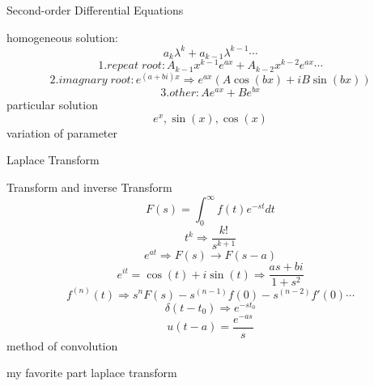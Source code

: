 \documentclass{beamer}
\begin{document}
\begin{frame}{Second-order Differential Equations}
     
        homogeneous solution:
        \[a_k\lambda^k+a_{k-1}\lambda^{k-1}\cdots \]
        \[1.repeat \; root : A_{k-1}x^{k-1}e^{ax}+A_{k-2}x^{k-2}e^{ax}\cdots\]
        \[2.imagnary\; root: e^{(a+bi)x}\Rightarrow e^{ax}(A\cos(bx)+iB\sin(bx)) \] 
        \[3.other : Ae^{ax}+Be^{bx}\]
        particular solution
        \[e^x,\sin(x),\cos(x)\]
        variation of parameter
        
     
      
\end{frame}

\begin{frame}{Laplace Transform}
     
    Transform and inverse Transform
    \small{\[F(s)={\int^\infty_0} f(t)e^{-st}dt\]
    \[t^k\Rightarrow\frac{k!}{s^{k+1}}\]
    \[e^{at} \Rightarrow F(s)\rightarrow F(s-a)  \]
    \[e^{it}=\cos(t)+i\sin(t)\Rightarrow\frac{as+bi}{1+s^2}\]
    \[f^{(n)}(t)\Rightarrow s^nF(s)-s^{(n-1)}f(0)-s^{(n-2)}f'(0)\cdots\]
    \[\delta(t-t_0) \Rightarrow  e^{-st_0}\]
    \[u(t-a)=\frac{e^{-as}}{s}\]}
    method  of convolution
    
    
     
      
\end{frame}
\begin{frame}{my favorite part}
 \huge{laplace transform}
\end{frame}
\end{document}
